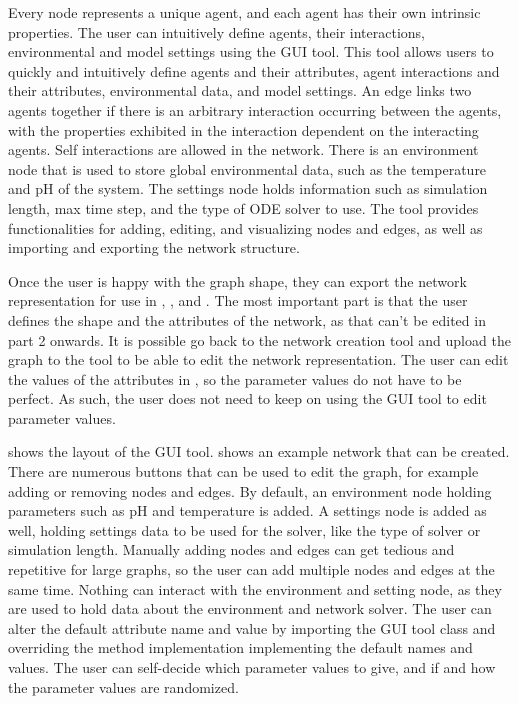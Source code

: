 Every node represents a unique agent, and each agent has their own intrinsic properties. 
The user can intuitively define agents, their interactions, environmental and model settings using the GUI tool. 
This tool allows users to quickly and intuitively define agents and their attributes, agent interactions and their attributes, environmental data, and model settings.
An edge links two agents together if there is an arbitrary interaction occurring between the agents, with the properties exhibited in the interaction dependent on the interacting agents. 
Self interactions are allowed in the network. 
There is an environment node that is used to store global environmental data, such as the temperature and pH of the system.
The settings node holds information such as simulation length, max time step, and the type of ODE solver to use.
The tool provides functionalities for adding, editing, and visualizing nodes and edges, as well as importing and exporting the network structure.  

Once the user is happy with the graph shape, they can export the network representation for use in , , and . 
The most important part is that the user defines the shape and the attributes of the network, as that can't be edited in part 2 onwards. 
It is possible go back to the network creation tool and upload the graph to the tool to be able to edit the network representation. \newline
The user can edit the values of the attributes in , so the parameter values do not have to be perfect. 
As such, the user does not need to keep on using the GUI tool to edit parameter values. 

 shows the layout of the GUI tool.  shows an example network that can be created.
There are numerous buttons that can be used to edit the graph, for example adding or removing nodes and edges. 
By default, an environment node holding parameters such as pH and temperature is added.
A settings node is added as well, holding settings data to be used for the solver, like the type of solver or simulation length.
Manually adding nodes and edges can get tedious and repetitive for large graphs, so the user can add multiple nodes and edges at the same time.
Nothing can interact with the environment and setting node, as they are used to hold data about the environment and network solver.
The user can alter the default attribute name and value by importing the GUI tool class and overriding the method implementation implementing the default names and values. 
The user can self-decide which parameter values to give, and if and how the parameter values are randomized. 

